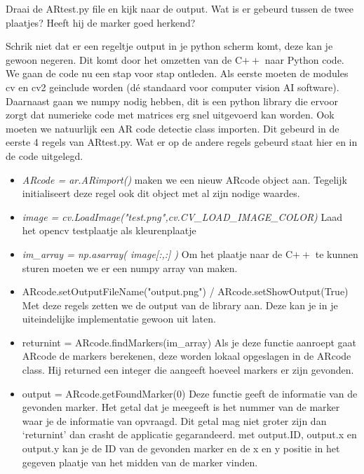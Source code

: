 \documentclass[a4paper]{article}
\begin{document}
\begin{Exercise}
 Draai de ARtest.py file en kijk naar de output. Wat is er gebeurd tussen de twee plaatjes? Heeft hij de marker goed herkend?
\end{Exercise}
\vspace{10 mm}

Schrik niet dat er een regeltje output in je python scherm komt, deze kan je gewoon negeren. Dit komt door het omzetten van de C$\stackrel{}{++}$ naar Python code. 
We gaan de code nu een stap voor stap ontleden. Als eerste moeten de modules cv en cv2 geinclude worden (d\'e standaard voor computer vision AI software). Daarnaast gaan we numpy nodig hebben, dit is een python library die ervoor zorgt dat numerieke code met matrices erg snel uitgevoerd kan worden. Ook moeten we natuurlijk een AR code detectie class importen. Dit gebeurd in de eerste 4 regels van ARtest.py. Wat er op de andere regels gebeurd staat hier en in de code uitgelegd.
\begin{itemize}
\item \emph{ARcode = ar.ARimport()} maken we een nieuw ARcode object aan. Tegelijk initialiseert deze regel ook dit object met al zijn nodige waardes.
\item \emph{image = cv.LoadImage("test.png",cv.CV\_LOAD\_IMAGE\_COLOR)} Laad het opencv testplaatje als kleurenplaatje
\item \emph{im\_array = np.asarray( image[:,:] ) } Om het plaatje naar de C$\stackrel{}{++}$ te kunnen sturen moeten we er een numpy array van maken.
\item{ARcode.setOutputFileName("output.png") / ARcode.setShowOutput(True)} Met deze regels zetten we de output van de library aan. Deze kan je in je uiteindelijke implementatie gewoon uit laten.
\item{returnint = ARcode.findMarkers(im\_array)} Als je deze functie aanroept gaat ARcode de markers berekenen, deze worden lokaal opgeslagen in de ARcode class. Hij returned een integer die aangeeft hoeveel markers er zijn gevonden.
\item{output = ARcode.getFoundMarker(0)} Deze functie geeft de informatie van de gevonden marker. Het getal dat je meegeeft is het nummer van de marker waar je de informatie van opvraagd. Dit getal mag niet groter zijn dan `returnint' dan crasht de applicatie gegarandeerd. met output.ID, output.x en output.y kan je de ID van de gevonden marker en de x en y positie in het gegeven plaatje van het midden van de marker vinden.
\end{itemize}
\end{document}
